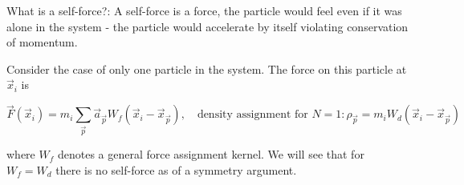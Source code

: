 
\textcolor{blue1}{What is a self-force?:} A self-force is a force, the particle would feel
even if it was alone in the system - the particle would accelerate by itself violating
conservation of momentum.

Consider the case of only one particle in the system. The force on
this particle at $\vec{x}_i$ is

\begin{equation}
    \vec{F}(\vec{x}_i) = m_i \sum_\vec{p} \vec{a}_\vec{p} W_f(\vec{x}_i - \vec{x}_\vec{p}), \quad \text{density assignment for } N = 1: \rho_\vec{p} = m_i W_d(\vec{x}_i - \vec{x}_\vec{p})
\end{equation}

where $W_f$ denotes a general force assignment kernel. \textcolor{blue1}{We will
see that for $W_f = W_d$ there is no self-force as of a symmetry argument.}

